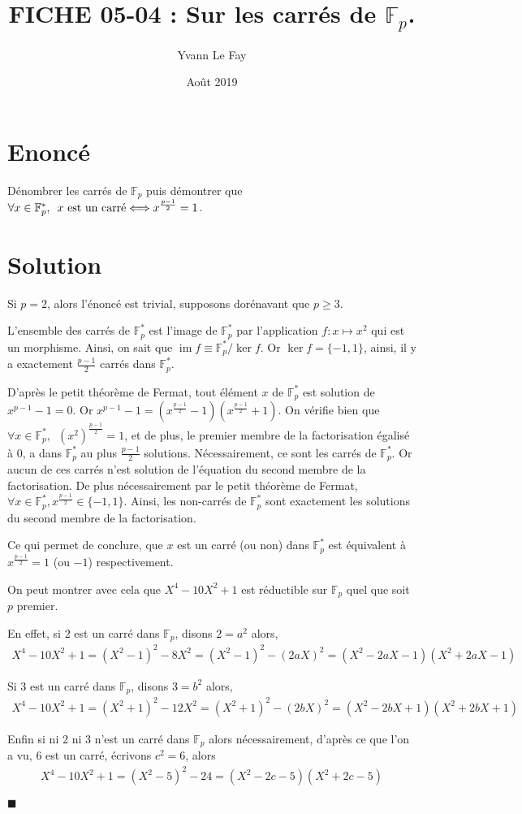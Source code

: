 \documentclass{article}
\newcommand*{\QED}{\hfill\ensuremath{\blacksquare}}%
\DeclareMathOperator{\im}{im}
\begin{document}
\title{FICHE 05-04 : Sur les carrés de $\mathbb{F}_p$.}
\author{Yvann Le Fay}
\date{Août 2019}
\maketitle
\section*{Enoncé}
Dénombrer les carrés de $\mathbb{F}_p$ puis démontrer que $\forall x \in \mathbb{F}_p^*,\,\,\, x  \textup{ est un carré} \Longleftrightarrow x^{\frac{p-1}{2}} = 1$.
\section*{Solution}
Si $p = 2$, alors l'énoncé est trivial, supposons dorénavant que $p\geq 3$.

L'ensemble des carrés de $\mathbb{F}_p^*$ est l'image de $\mathbb{F}_p^*$ par l'application $f : x \mapsto x^2$ qui est un morphisme. Ainsi, on sait que $\im f \equiv \mathbb{F}_p^*/\ker f$. Or $\ker f = \{-1, 1\}$, ainsi, il y a exactement $\frac{p-1}{2}$ carrés dans $\mathbb{F}_p^*$.

D'après le petit théorème de Fermat, tout élément $x$ de $\mathbb{F}_p^*$ est solution de $x^{p-1} - 1 = 0$. Or $x^{p-1}  - 1 = (x^{\frac{p-1}{2}}-1)(x^{\frac{p-1}{2}}+1)$. On vérifie bien que $\forall x \in \mathbb{F}_p^*,\,\,\, (x^2)^{\frac{p-1}{2}} = 1$, et de plus, le premier membre de la factorisation égalisé à $0$, a dans $\mathbb{F}_p^*$ au plus $\frac{p-1}{2}$ solutions. Nécessairement, ce sont les carrés de $\mathbb{F}_p^*$. Or aucun de ces carrés n'est solution de l'équation du second membre de la factorisation. De plus nécessairement par le petit théorème de Fermat, $\forall x \in \mathbb{F}_p^*, x^{\frac{p-1}{2}} \in \{-1, 1\}$. Ainsi, les non-carrés de $\mathbb{F}_p^*$ sont exactement les solutions du second membre de la factorisation. 

Ce qui permet de conclure, que $x$ est un carré (ou non) dans $\mathbb{F}_p^*$ est équivalent à $x^{\frac{p-1}{2}} = 1$ (ou $-1$) respectivement.

On peut montrer avec cela que $X^4-10X^2+1$ est réductible sur $\mathbb{F}_p$ quel que soit $p$ premier. 

En effet, si $2$ est un carré dans $\mathbb{F}_p$, disons $2 = a^2$ alors, 
\begin{align*}
	X^4-10X^2 + 1 = (X^2-1)^2 - 8X^2 = (X^2-1)^2 - (2aX)^2 = (X^2-2aX-1)(X^2+2aX-1)
\end{align*}

Si $3$ est un carré dans $\mathbb{F}_p$, disons $3 = b^2$ alors,
\begin{align*}
	X^4-10X^2 + 1 = (X^2+1)^2 - 12X^2 = (X^2+1)^2 - (2bX)^2 = (X^2-2bX+1)(X^2+2bX+1)
\end{align*}

Enfin si ni $2$ ni $3$ n'est un carré dans $\mathbb{F}_p$ alors nécessairement, d'après ce que l'on a vu, $6$ est un carré, écrivons $c^2 = 6$, alors
\begin{align*}
	X^4-10X^2 + 1 = (X^2-5)^2 - 24 = (X^2-2c-5)(X^2+2c-5)
\end{align*}

\QED
\end{document}
